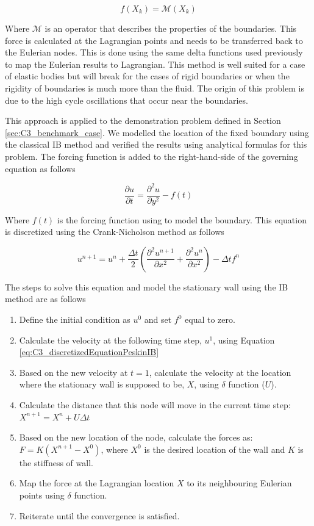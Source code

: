 \begin{equation}
    f(X_k) = \mathcal{M}(X_k)
\end{equation}

Where $\mathcal{M}$ is an operator that describes the properties of the boundaries. This force is calculated at the Lagrangian points and needs to be transferred back to the Eulerian nodes. This is done using the same delta functions used previously to map the Eulerian results to Lagrangian. This method is well suited for a case of elastic bodies but will break for the cases of rigid boundaries or when the rigidity of boundaries is much more than the fluid. The origin of this problem is due to the high cycle oscillations that occur near the boundaries.

This approach is applied to the demonstration problem defined in Section \ref{sec:C3_benchmark_case}. We modelled the location of the fixed boundary using the classical IB method and verified the results using analytical formulas for this problem. The forcing function is added to the right-hand-side of the governing equation as follows

\begin{equation}
    \frac{\partial u}{\partial t} = \frac{\partial^2 u}{\partial y^2} - f(t)
\end{equation}

Where $f(t)$ is the forcing function using to model the boundary. This equation is discretized using the Crank-Nicholson method as follows

\begin{equation}\label{eq:C3_discretizedEquationPeskinIB}
    u^{n+1} = u^{n} + \frac{\Delta t}{2} \left( \frac{\partial^2 u^{n+1}}{\partial x^2} + 
                                                \frac{\partial^2 u^n}{\partial x^2}\right) - \Delta t f^n 
\end{equation}

The steps to solve this equation and model the stationary wall using the IB method are as follows

\begin{enumerate}
    \item Define the initial condition as $u^0$ and set $f^0$ equal to zero.
    \item Calculate the velocity at the following time step, $u^1$, using Equation \eqref{eq:C3_discretizedEquationPeskinIB}
    \item Based on the new velocity at $t=1$, calculate the velocity at the location where the stationary wall is supposed to be, $X$, using $\delta$ function ($U$).
    \item Calculate the distance that this node will move in the current time step: $X^{n+1} = X^n + U \Delta t$
    \item Based on the new location of the node, calculate the forces as: $F = K \left( X^{n+1} - X^0 \right)$, where $X^0$ is the desired location of the wall and $K$ is the stiffness of wall. 
    \item Map the force at the Lagrangian location $X$ to its neighbouring Eulerian points using $\delta$ function.
    \item Reiterate until the convergence is satisfied.
\end{enumerate}


